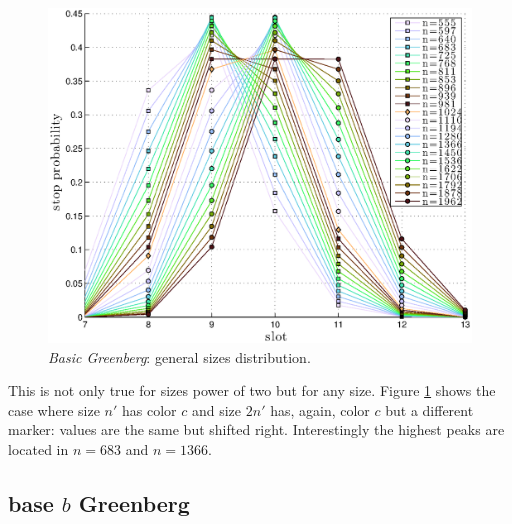 \documentclass[12pt,a4paper]{report}
\begin{document}
\begin{figure}[H]
\begin{center}
\includegraphics[scale=.7]{matlab/Greenberg_stop_prob/greenberg-stop-distribution-intermediate-values}
\caption{\emph{Basic Greenberg}:  general sizes distribution.}
\label{fig:greenberg-dist-general}
\end{center}
\end{figure}
This is not only true for sizes power of two but for any size. Figure \ref{fig:greenberg-dist-general} shows the case where size $n'$ has color $c$ and size $2n'$ has, again, color $c$ but a different marker: values are the same but shifted right. Interestingly the highest peaks are located in $n=683$ and $n=1366$.

\subsection{base $b$ Greenberg}
\end{document}
